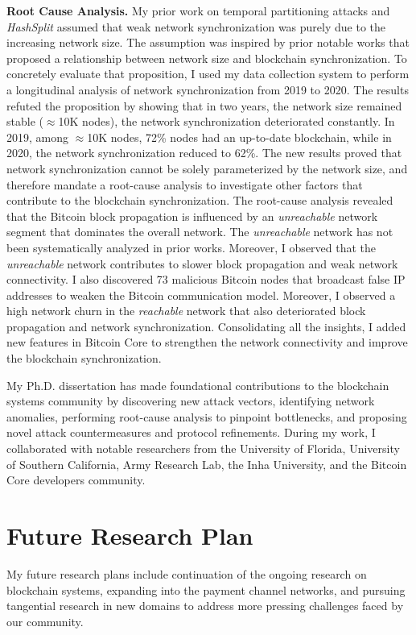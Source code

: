 \documentclass{NSF}
\newcommand{\BfPara}[1]{{\noindent\textbf{#1.}}\xspace}
\begin{document}
\BfPara{Root Cause Analysis} My prior work on temporal partitioning attacks and {\em HashSplit} assumed that weak network synchronization was purely due to the increasing network size. The assumption was inspired by prior notable works that proposed a relationship between network size and blockchain synchronization. To concretely evaluate that proposition, I used my data collection system to perform a longitudinal analysis of network synchronization from 2019 to 2020. The results refuted the proposition by showing that in two years, the network size remained stable ($\approx$10K nodes), the network synchronization deteriorated constantly. In 2019, among $\approx$10K nodes, 72\% nodes had an up-to-date blockchain, while in 2020, the network synchronization reduced to 62\%. The new results proved that network synchronization cannot be solely parameterized by the network size, and therefore mandate a root-cause analysis to investigate other factors that contribute to the blockchain synchronization. The root-cause analysis revealed that the Bitcoin block propagation is influenced by an {\em unreachable} network segment that dominates the overall network. The {\em unreachable} network has not been systematically analyzed in prior works. Moreover, I observed that the {\em unreachable} network contributes to slower block propagation and weak network connectivity. I also discovered 73 malicious Bitcoin nodes that broadcast false IP addresses to weaken the Bitcoin communication model. Moreover, I observed a high network churn in the {\em reachable} network that also deteriorated block propagation and network synchronization. Consolidating all the insights, I added new features in Bitcoin Core to strengthen the network connectivity and improve the blockchain synchronization.  

My Ph.D. dissertation has made foundational contributions to the blockchain systems community by discovering new attack vectors, identifying network anomalies, performing root-cause analysis to pinpoint bottlenecks, and proposing novel attack countermeasures and protocol refinements. During my work, I collaborated with notable researchers from the University of Florida, University of Southern California, Army Research Lab, the Inha University, and the Bitcoin Core developers community.  



\section{Future Research Plan}
My future research plans include continuation of the ongoing research on blockchain systems, expanding into the payment channel networks, and pursuing tangential research in new domains to address more pressing challenges faced by our community. 
\end{document}
